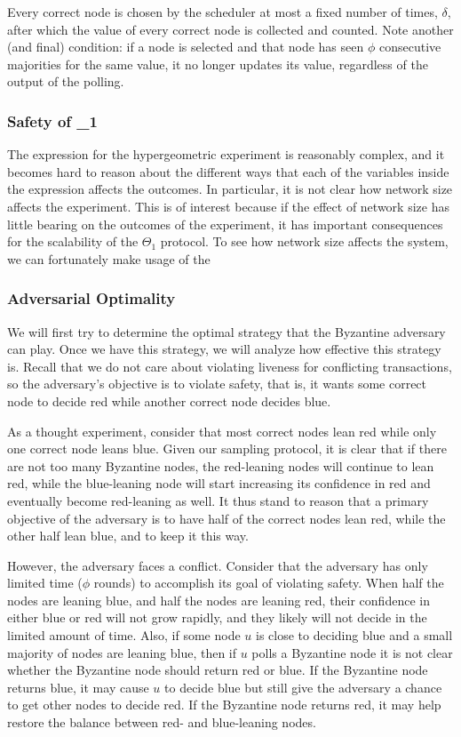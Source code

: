 Every correct node is chosen by the scheduler at most a fixed number of times, $\delta$, after which the value of every correct node is collected and counted.
Note another (and final) condition: if a node is selected and that node has seen $\phi$ consecutive majorities for the same value, it no longer updates its value, regardless of the output of the polling. 

\subsubsection{Safety of \Theta_1}
The expression for the hypergeometric experiment is reasonably complex, and it becomes hard to reason about the different ways that each of the variables inside the expression affects the outcomes. In particular, it is not clear how network size affects the experiment. This is of interest because if the effect of network size has little bearing on the outcomes of the experiment, it has important consequences for the scalability of the $\Theta_1$ protocol. To see how network size affects the system, we can fortunately make usage of the 

\subsubsection{Adversarial Optimality}
We will first try to determine the optimal strategy that the Byzantine
adversary can play.  Once we have this strategy, we will analyze how
effective this strategy is.
Recall that we do not care about violating liveness for conflicting
transactions, so the adversary's objective is to violate
safety, that is, it wants some correct node to decide red while another
correct node decides blue.  

As a thought experiment, consider that most correct nodes lean red
while only one correct node leans blue.  Given our sampling protocol,
it is clear that if there are not too many Byzantine nodes, the red-leaning
nodes will continue to lean red, while the blue-leaning node will
start increasing its confidence in red and eventually become red-leaning
as well.  It thus stand to reason that a primary objective of the adversary
is to have half of the correct nodes lean red, while the other half lean
blue, and to keep it this way.

However, the adversary faces a conflict.  Consider that the adversary
has only limited time ($\phi$ rounds) to accomplish its goal of
violating safety.  When half the nodes are leaning blue, and half
the nodes are leaning red, their confidence in either blue or red
will not grow rapidly, and they likely will not decide in the limited
amount of time.  Also, if some node $u$ is close to deciding blue
and a small majority of nodes are leaning blue, then if $u$ polls
a Byzantine node it is not clear whether the Byzantine node should
return red or blue.  If the Byzantine node returns blue, it may
cause $u$ to decide blue but still give the adversary a chance to
get other nodes to decide red.  If the Byzantine node returns red,
it may help restore the balance between red- and blue-leaning nodes.

